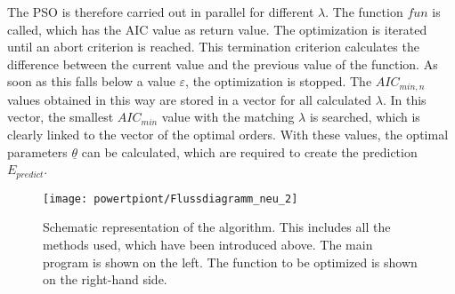 The PSO is therefore carried out in parallel for different $\lambda$. The function $fun$ is called, which has the AIC value as return value. The optimization is iterated until an abort criterion is reached. This termination criterion calculates the difference between the current value and the previous value of the function. As soon as this falls below a value $\varepsilon$, the optimization is stopped. The $AIC_{min,n}$ values obtained in this way are stored in a vector for all calculated $\lambda$. In this vector, the smallest $AIC_{min}$ value with the matching $\lambda$ is searched, which is clearly linked to the vector of the optimal orders. With these values, the optimal parameters $\underline{\theta}$ can be calculated, which are required to create the prediction $E_{predict}$.




\begin{figure}[!htb]
    \centering
    \texttt{[image: powertpiont/Flussdiagramm\_neu\_2]} %
    \caption[Scheme of the algorithm]{Schematic representation of the algorithm. This includes all the methods used, which have been introduced above. The main program is shown on the left. The function to be optimized is shown on the right-hand side.}
    \label{fig:flowchart}
\end{figure}




 


